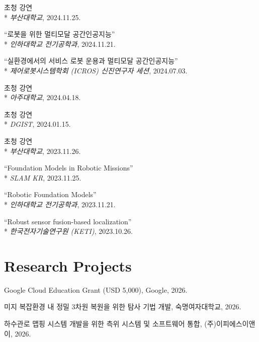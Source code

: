 \documentclass[margin]{res}
\begin{document}
\begin{resume}
		\par 초청 강연\\*
		\textit{부산대학교}, 2024.11.25.

		\par ``로봇을 위한 멀티모달 공간인공지능''\\*
		\textit{인하대학교 전기공학과}, 2024.11.21.

		\par ``실환경에서의 서비스 로봇 운용과 멀티모달 공간인공지능''\\*
		\textit{제어로봇시스템학회 (ICROS) 신진연구자 세션}, 2024.07.03.

		\par 초청 강연\\*
		\textit{아주대학교}, 2024.04.18.

		\par 초청 강연\\*
		\textit{DGIST}, 2024.01.15.

		\par 초청 강연\\*
		\textit{부산대학교}, 2023.11.26.

		\par ``Foundation Models in Robotic Missions''\\*
		\textit{SLAM KR}, 2023.11.25.

		\par ``Robotic Foundation Models''\\*
		\textit{인하대학교 전기공학과}, 2023.11.21.

		\par ``Robust sensor fusion-based localization''\\*
		\textit{한국전자기술연구원 (KETI)}, 2023.10.26.
		\par\endgroup
			
		\section{Research Projects}
		\par Google Cloud Education Grant (USD 5,000), Google, 2026.

		\par 미지 복잡환경 내 정밀 3차원 복원을 위한 탐사 기법 개발, 숙명여자대학교, 2026.

		\par 하수관로 맵핑 시스템 개발을 위한 측위 시스템 및 소프트웨어 통합, (주)이피에스이앤이, 2026.


\end{resume}
\end{document}
